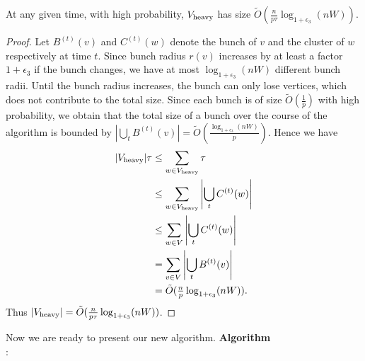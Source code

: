 \begin{lemma}\label{lm:size_heavy_moved}
 At any given time, with high probability, $ V_{\rm{heavy}} $ has size $\tilde O (\tfrac{n }{p\tau}\log_{1+\epsilon_3}(nW)) $.\label{lm:size_H}
\end{lemma}
\begin{proof}
    Let $B^{(t)}(v)$ and $C^{(t)}(w)$ denote the bunch of $v$  and the cluster of $w$ respectively at time $t$. Since bunch radius $r(v)$ increases by at least a factor $1+\epsilon_3$ if the bunch changes, we have at most $\log_{1+\epsilon_3}(nW)$ different bunch radii. Until the bunch radius increases, the bunch can only lose vertices, which does not contribute to the total size. Since each bunch is of size $\tilde{O}(\tfrac{1}{p})$ with high probability, we obtain that the total size of a bunch over the course of the algorithm is bounded by $\left|\bigcup_{t} B^{(t)}(v)\right|=\tilde{O}\left(\tfrac{\log_{1+\epsilon_3}(nW)}{p}\right)$. Hence we have 
    \begin{align*}
        |V_{\rm{heavy}}|\tau &\leq \sum_{w\in V_{\rm{heavy}}} \tau \\
        &\leq \sum_{w\in V_{\rm{heavy}}} \left| \bigcup_t C^{(t)}(w) \right| \\
        &\leq \sum_{w\in V} \left| \bigcup_t C^{(t)}(w) \right| \\
        &= \sum_{v\in V} \left| \bigcup_t B^{(t)}(v) \right| \\
        &= \tilde O ( \tfrac{n}{p}\log_{1+\epsilon_3}(nW)).
    \end{align*}
    Thus $|V_{\rm{heavy}}| = \tilde O (\tfrac{n }{p\tau}\log_{1+\epsilon_3}(nW))$.\qedhere
\end{proof}

Now we are ready to present our new algorithm. 
\textbf{Algorithm} \\
\Initialization{}:

